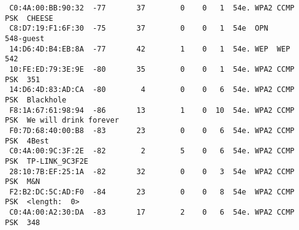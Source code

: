 \documentclass[10pt,a4paper]{article}
\begin{document}
\begin{itemize}
\begin{lstlisting}
 C0:4A:00:BB:90:32  -77       37        0    0   1  54e. WPA2 CCMP   PSK  CHEESE                                                                                                                                                             
 C8:D7:19:F1:6F:30  -75       37        0    0   1  54e  OPN              548-guest                                                                                                                                                         
 14:D6:4D:B4:EB:8A  -77       42        1    0   1  54e. WEP  WEP         542                                                                                                                                                                
 10:FE:ED:79:3E:9E  -80       35        0    0   1  54e. WPA2 CCMP   PSK  351                                                                                                                                                                
 14:D6:4D:83:AD:CA  -80        4        0    0   6  54e. WPA2 CCMP   PSK  Blackhole                                                                                                                                                         
 F8:1A:67:61:98:94  -86       13        1    0  10  54e. WPA2 CCMP   PSK  We will drink forever                                                                                                                                              
 F0:7D:68:40:00:B8  -83       23        0    0   6  54e. WPA2 CCMP   PSK  4Best                                                                                                                                                             
 C0:4A:00:9C:3F:2E  -82        2        5    0   6  54e. WPA2 CCMP   PSK  TP-LINK_9C3F2E                                                                                                                                                     
 28:10:7B:EF:25:1A  -82       32        0    0   3  54e  WPA2 CCMP   PSK  M&N                                                                                                                                                               
 F2:B2:DC:5C:AD:F0  -84       23        0    0   8  54e  WPA2 CCMP   PSK  <length:  0>                                                                                                                                                       
 C0:4A:00:A2:30:DA  -83       17        2    0   6  54e. WPA2 CCMP   PSK  348                                                                                                                                                                

\end{lstlisting}
\end{itemize}
\end{document}
